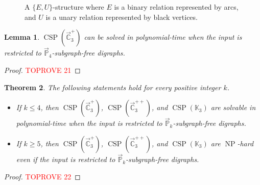 \documentclass{article}
\newtheorem{theorem}{Theorem}
\newtheorem{lemma}[theorem]{Lemma}
\theoremstyle{definition}
\theoremstyle{remark}
\DeclareMathOperator{\NP}{NP}
\DeclareMathOperator{\CSP}{CSP}
\newcommand{\bC}{{\mathbb C}}
\newcommand{\bG}{{\mathbb G}}
\newcommand{\bK}{{\mathbb K}}
\newcommand{\bP}{{\mathbb P}}
\begin{document}
\begin{figure}[ht!]
\centering
{}
\caption{A $\{E,U\}$-structure where $E$ is a binary relation represented by arcs, and $U$ is a unary relation represented by black vertices.}
\label{fig:digraph+unaries}
\end{figure}



\begin{lemma}\label{lem:C3+-P4-subgraph-free}
    $\CSP(\vec{\bC}_3^+)$ can be solved in polynomial-time when the input is restricted
    to $\vec{\bP}_4$-subgraph-free digraphs.
\end{lemma}
\begin{proof}\textcolor{red}{TOPROVE 21}\end{proof}


\begin{theorem}\label{thm:3-vertices-Pk-subgraph-free}
    The following statements hold for every positive integer $k$.
    \begin{itemize}
        \item If $k\le 4$, then $\CSP(\vec{\bC}_3^+)$, $\CSP(\vec{\bC}_3^{++})$, and $\CSP(\bK_3)$ are solvable in polynomial-time
        when the input is restricted to $\vec{\bP}_k$-subgraph-free digraphs. 
        \item If $k\ge 5$, then $\CSP(\vec{\bC}_3^+)$, $\CSP(\vec{\bC}_3^{++})$, and $\CSP(\bK_3)$ are $\NP$-hard even
        if the input is restricted to $\vec{\bP}_k$-subgraph-free digraphs.
    \end{itemize}
\end{theorem}
\begin{proof}\textcolor{red}{TOPROVE 22}\end{proof}
\end{document}

